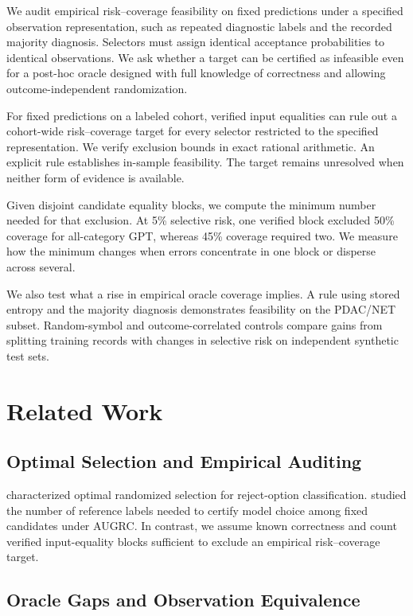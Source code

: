 \documentclass[letterpaper]{article}
\begin{document}
We audit empirical risk--coverage feasibility on fixed predictions under a specified observation representation, such as repeated diagnostic labels and the recorded majority diagnosis. Selectors must assign identical acceptance probabilities to identical observations. We ask whether a target can be certified as infeasible even for a post-hoc oracle designed with full knowledge of correctness and allowing outcome-independent randomization.

For fixed predictions on a labeled cohort, verified input equalities can rule out a cohort-wide risk--coverage target for every selector restricted to the specified representation. We verify exclusion bounds in exact rational arithmetic. An explicit rule establishes in-sample feasibility. The target remains unresolved when neither form of evidence is available.

Given disjoint candidate equality blocks, we compute the minimum number needed for that exclusion. At 5\% selective risk, one verified block excluded 50\% coverage for all-category GPT, whereas 45\% coverage required two. We measure how the minimum changes when errors concentrate in one block or disperse across several.

We also test what a rise in empirical oracle coverage implies. A rule using stored entropy and the majority diagnosis demonstrates feasibility on the PDAC/NET subset. Random-symbol and outcome-correlated controls compare gains from splitting training records with changes in selective risk on independent synthetic test sets.

\section{Related Work}

\subsection{Optimal Selection and Empirical Auditing}

\citet{franc2023} characterized optimal randomized selection for reject-option classification. \citet{kuboyama2026} studied the number of reference labels needed to certify model choice among fixed candidates under AUGRC. In contrast, we assume known correctness and count verified input-equality blocks sufficient to exclude an empirical risk--coverage target.

\subsection{Oracle Gaps and Observation Equivalence}
\end{document}

